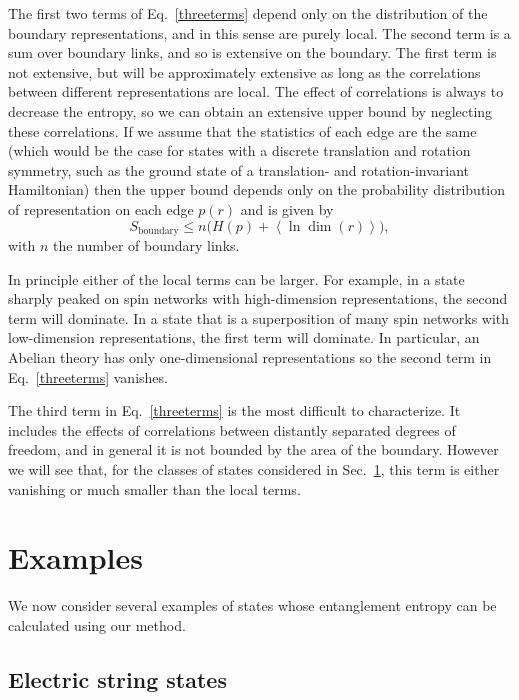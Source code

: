 \documentclass[aps,prd,twocolumn,showpacs,groupedaddress,nofootinbib,letterpaper]{revtex4}
\newcommand{\avg}[1]{\left\langle#1\right\rangle}
\begin{document}
The first two terms of Eq.~\eqref{threeterms} depend only on the distribution of the boundary representations, and in this sense are purely local.
The second term is a sum over boundary links, and so is extensive on the boundary.
The first term is not extensive, but will be approximately extensive as long as the correlations between different representations are local.
The effect of correlations is always to decrease the entropy, so we can obtain an extensive upper bound by neglecting these correlations.
If we assume that the statistics of each edge are the same (which would be the case for states with a discrete translation and rotation symmetry, such as the ground state of a translation- and rotation-invariant Hamiltonian) then the upper bound depends only on the probability distribution of representation on each edge $p(r)$ and is given by
\begin{equation}
S_\text{boundary} \leq n \Big( H(p) + \avg{\ln \dim (r)} \Big),
\end{equation}
with $n$ the number of boundary links.

In principle either of the local terms can be larger.
For example, in a state sharply peaked on spin networks with high-dimension representations, the second term will dominate. 
In a state that is a superposition of many spin networks with low-dimension representations, the first term will dominate.
In particular, an Abelian theory has only one-dimensional representations so the second term in Eq.~\eqref{threeterms} vanishes.

The third term in Eq.~\eqref{threeterms} is the most difficult to characterize.
It includes the effects of correlations between distantly separated degrees of freedom, and in general it is not bounded by the area of the boundary.
However we will see that, for the classes of states considered in Sec.~\ref{section:examples}, this term is either vanishing or much smaller than the local terms.

\section{Examples} \label{section:examples}
We now consider several examples of states whose entanglement entropy can be calculated using our method.

\subsection{Electric string states} \label{section:electricstrings}
\end{document}
